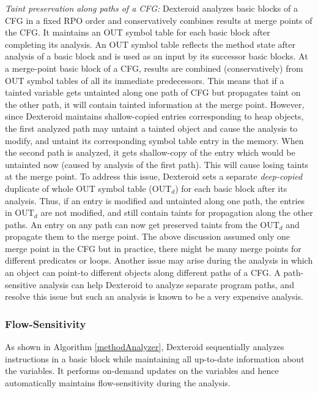 \documentclass[10pt]{elsarticle}
\begin{document}
{\noindent \emph{Taint preservation along paths of a CFG:}} Dexteroid analyzes basic blocks of a CFG in a fixed RPO order and conservatively combines results at merge points of the CFG. It maintains an {\ttfamily OUT} symbol table for each basic block after completing its analysis. An {\ttfamily OUT} symbol table reflects the method state after analysis of a basic block and is used as an input by its successor basic blocks. At a merge-point basic block of a CFG, results are combined (conservatively) from {\ttfamily OUT} symbol tables of all its immediate predecessors. This means that if a tainted variable gets untainted along one path of CFG but propagates taint on the other path, it will contain tainted information at the merge point. However, since Dexteroid maintains shallow-copied entries corresponding to heap objects, the first analyzed path may untaint a tainted object and cause the analysis to modify, and untaint its corresponding symbol table entry in the memory. When the second path is analyzed, it gets shallow-copy of the entry which would be untainted now (caused by analysis of the first path). This will cause losing taints at the merge point. To address this issue, Dexteroid sets a separate \emph{deep-copied} duplicate of whole {\ttfamily OUT} symbol table ({\ttfamily OUT$_d$}) for each basic block after its analysis. Thus, if an entry is modified and untainted along one path, the entries in {\ttfamily OUT$_d$} are not modified, and still contain taints for propagation along the other paths. An entry on any path can now get preserved taints from the {\ttfamily OUT$_d$} and propagate them to the merge point. The above discussion assumed only one merge point in the CFG but in practice, there might be many merge points for different predicates or loops. Another issue may arise during the analysis in which an object can point-to different objects along different paths of a CFG. A path-sensitive analysis can help Dexteroid to analyze separate program paths, and resolve this issue but such an analysis is known to be a very expensive analysis. 

\subsubsection{Flow-Sensitivity} 

As shown in Algorithm \ref{methodAnalyzer}, Dexteroid sequentially analyzes instructions in a basic block while maintaining all up-to-date information about the variables. It performs on-demand updates on the variables and hence automatically maintains flow-sensitivity during the analysis.
\end{document}
